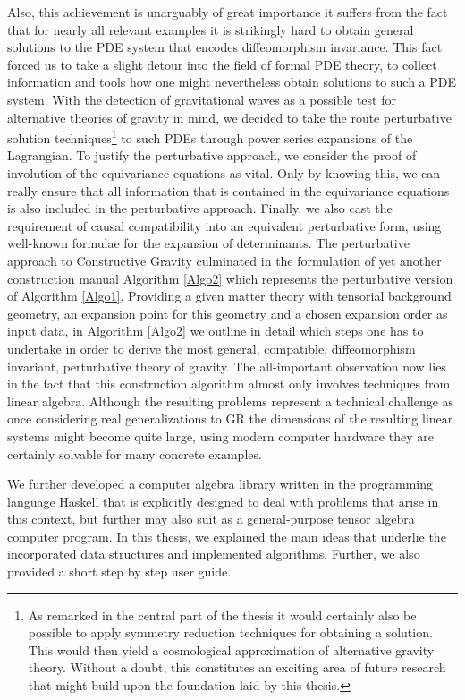 \documentclass[a4paper,12pt, DIV=14, BCOR=5mm, twoside, headsepline, numbers=noenddot]{scrbook}
\begin{document}
Also, this achievement is unarguably of great importance it suffers from the fact that for nearly all relevant examples it is strikingly hard to obtain general solutions to the 
PDE system that encodes diffeomorphism invariance. 
This fact forced us to take a slight detour into the field of formal PDE theory, to collect information and tools how one might nevertheless obtain solutions to such a PDE system. 
With the detection of gravitational waves as a possible test for alternative theories of gravity in mind, we decided to take the route perturbative solution techniques\footnote{As remarked in the central part of the thesis it would certainly also be possible to apply symmetry reduction techniques for obtaining a solution. This would then yield a cosmological approximation of alternative gravity theory. Without a doubt, this constitutes an exciting area of future research that might build upon the foundation laid by this thesis.} to such PDEs through power series expansions of the Lagrangian. To justify the perturbative approach, we consider the proof of involution of the equivariance equations
as vital. Only by knowing this, we can really ensure that all information that is contained in the equivariance equations is also included in the perturbative approach. 
Finally, we also cast the requirement of causal compatibility into an equivalent perturbative form, using well-known formulae for the expansion of determinants. The perturbative approach to Constructive Gravity culminated in the formulation of yet another construction manual Algorithm \ref{Algo2} which represents the perturbative version of Algorithm \ref{Algo1}. Providing a given matter theory with tensorial background geometry, an expansion point for this geometry and a chosen expansion order as input data, in Algorithm \ref{Algo2} we outline in detail which steps one has to undertake in order to derive the most general, compatible, diffeomorphism invariant, perturbative theory of gravity. The all-important observation now lies in the fact that this construction algorithm almost only involves techniques from linear algebra. Although the resulting problems represent a technical challenge as once considering real generalizations to GR the dimensions of the resulting linear systems might become quite large, using modern computer hardware they are certainly solvable for many concrete examples. 

We further developed a computer algebra library written in the programming language Haskell that is explicitly designed to deal with problems that arise in this context, but further may also suit as a general-purpose tensor algebra computer program. 
In this thesis, we explained the main ideas that underlie the incorporated data structures and implemented algorithms. Further, we also provided a short step by step user guide. 
\end{document}
